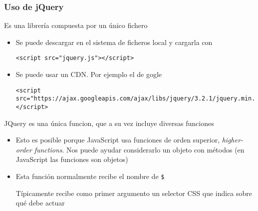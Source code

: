 \documentclass[ucs]{beamer}
\begin{document}
\begin{frame}[fragile]
\frametitle{Uso de jQuery}

Es una librería compuesta por un único fichero

    \begin{itemize}
    \item
Se puede descargar en el sistema de ficheros local y cargarla con


  \begin{scriptsize}
  \begin{verbatim}
<script src="jquery.js"></script>
  \end{verbatim}
  \end{scriptsize}

    \item
Se puede usar un CDN. Por ejemplo el de gogle

  \begin{tiny}
  \begin{verbatim}
<script src="https://ajax.googleapis.com/ajax/libs/jquery/3.2.1/jquery.min.js"></script>
  \end{verbatim}
  \end{tiny}

\end{itemize}

JQuery es una única funcion, que a su vez incluye diversas funciones

    \begin{itemize}
    \item
Esto es posible porque JavaScript usa funciones de orden superior, \emph{higher-order functions}.
Nos puede ayudar considerarlo un objeto con métodos (en JavaScript las funciones son objetos)


    \item
Esta función normalmente recibe el nombre de \verb|$|

Típicamente recibe como primer argumento un selector CSS que indica sobre qué
debe actuar
\end{itemize}
\end{frame}
\end{document}
